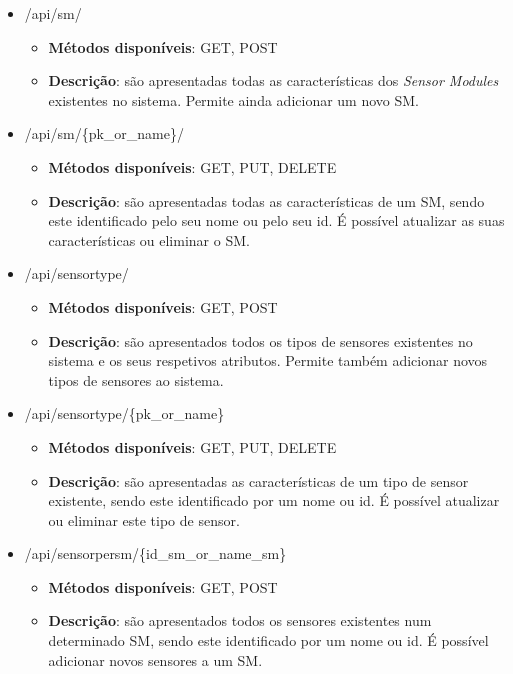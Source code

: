 \begin{itemize}
	
	\item /api/sm/
	\begin{itemize}
		\item \textbf{Métodos disponíveis}: GET, POST
		\item \textbf{Descrição}: são apresentadas todas as características dos \textit{Sensor Modules} existentes no sistema. Permite ainda adicionar um novo \acl{SM}. 
	\end{itemize}
	
	
	\item /api/sm/\{pk\_or\_name\}/
	\begin{itemize}
		\item \textbf{Métodos disponíveis}: GET, PUT, DELETE
		\item \textbf{Descrição}: são apresentadas todas as características de um \acl{SM}, sendo este identificado pelo seu nome ou pelo seu id. É possível atualizar as suas características ou eliminar o \acl{SM}. 
	\end{itemize}
	
	
	\item /api/sensortype/
	\begin{itemize}
		\item \textbf{Métodos disponíveis}: GET, POST
		\item \textbf{Descrição}: são apresentados todos os tipos de sensores existentes no sistema e os seus respetivos atributos. Permite também adicionar novos tipos de sensores ao sistema.
	\end{itemize}
	
	
	\item /api/sensortype/\{pk\_or\_name\}
	\begin{itemize}
		\item\textbf{ Métodos disponíveis}: GET, PUT, DELETE
		\item \textbf{Descrição}: são apresentadas as características de um tipo de sensor existente, sendo este identificado por um nome ou id. É possível atualizar ou eliminar este tipo de sensor. 
		
	\end{itemize}
	
	
	\item /api/sensorpersm/\{id\_sm\_or\_name\_sm\}
	\begin{itemize}
		\item \textbf{Métodos disponíveis}: GET, POST
		\item \textbf{Descrição}: são apresentados todos os sensores existentes num determinado \acl{SM}, sendo este identificado por um nome ou id. É possível adicionar novos sensores a um \acl{SM}. 
	\end{itemize}
	

\end{itemize}
